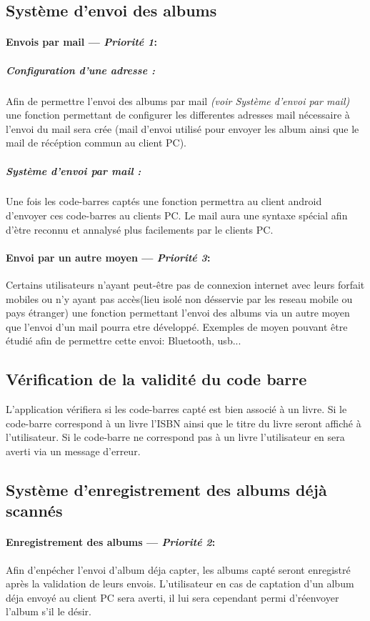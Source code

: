 \subsection{Système d'envoi des albums}
\paragraph{Envois par mail ---  \textit{Priorité 1}:}
\subparagraph{Configuration d'une adresse :}
Afin de permettre l'envoi des albums par mail \textit{(voir Système d'envoi par mail)} une fonction permettant de configurer les differentes adresses mail nécessaire à l'envoi du mail sera crée (mail d'envoi utilisé pour envoyer les album ainsi que le mail de récéption commun au client PC).

\subparagraph{Système d'envoi par mail :} 
Une fois les code-barres captés une fonction permettra au client android d'envoyer ces code-barres au clients PC. 
Le mail aura une syntaxe spécial afin d'ètre reconnu et annalysé plus facilements par le clients PC. 

\paragraph{Envoi par un autre moyen ---  \textit{Priorité 3}:}
Certains utilisateurs n'ayant peut-être pas de connexion internet avec leurs forfait mobiles ou n'y ayant pas accès(lieu isolé non désservie par les reseau mobile ou pays étranger) une fonction permettant l'envoi des albums via un autre moyen que l'envoi d'un mail pourra etre développé.
Exemples de moyen pouvant être étudié afin de permettre cette envoi: Bluetooth, usb...

\subsection{Vérification de la validité du code barre}
L'application vérifiera si les code-barres capté est bien associé à un livre.
Si le code-barre correspond à un livre l'ISBN ainsi que le titre du livre seront affiché à l'utilisateur.
Si le code-barre ne correspond pas à un livre l'utilisateur en sera averti via un message d'erreur.

\subsection{Système d'enregistrement des albums déjà scannés}
\paragraph{Enregistrement des albums ---  \textit{Priorité 2}:} 
Afin d'enpécher l'envoi d'album déja capter, les albums capté seront enregistré après la validation de leurs envois. 
L'utilisateur en cas de captation d'un album déja envoyé au client PC sera averti, il lui sera cependant permi d'réenvoyer l'album s'il le désir.

